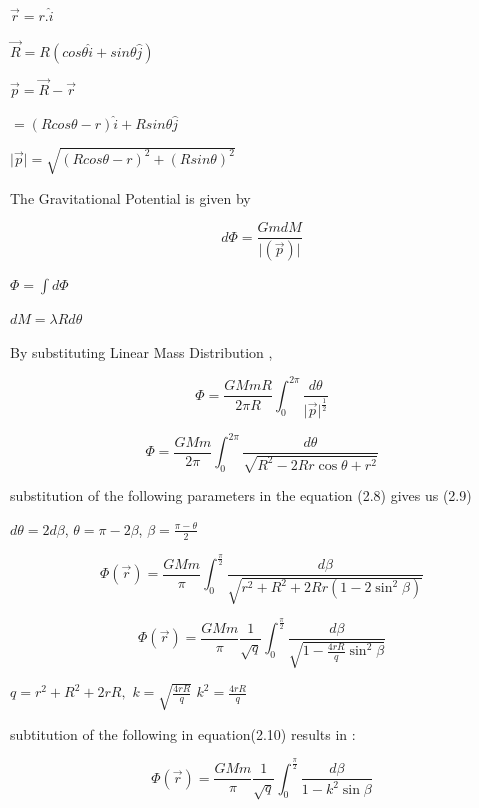 \begin{center}
$ \vec{r} = r.\hat{i} $

$ \vec{R} = R(cos \theta \hat{i} + sin \theta \hat{j} ) $

$ \vec{p} = \vec{R}-\vec{r} $

$ = (R cos \theta-r) \hat{i} + R sin \theta \hat{j} $


$ \vert \vec{p}\vert = \sqrt{(R cos \theta - r)^{2} + (R sin \theta )^{2} }$


 

The Gravitational Potential is given by 

\begin{equation}
 d{\Phi}= \frac{GmdM}{\vert (\vec{p})\vert} 
\end{equation}


$ \Phi = \int {d{\Phi}} $
  

$ d M = \lambda R d \theta  $

By substituting Linear Mass Distribution ,

\begin{equation}
\Phi= \frac{GMmR}{2\pi R} \int_{0}^{2\pi} \frac {d \theta } {\vert \vec{p} \vert^\frac{1}{2}}
\end{equation}

\begin{equation}
\Phi= \frac{GMm}{2\pi} \int_{0}^{2\pi}  
\frac{d{\theta}}{\sqrt{R^2 - 2 R r \cos \theta + r^2}}
\end{equation}


substitution of the following parameters in the equation (2.8) gives us (2.9)

$ d \theta = 2 d \beta $,
$ \theta = \pi - 2 \beta $,
$ \beta = \frac{\pi - \theta}{2} $

\begin{equation}
\Phi (\vec{r}) = \frac{GMm}{ \pi} \int_{0}^{\frac{\pi}{2}}  \frac{d \beta }{\sqrt{r^2 + R^2 +2 R r (1 - 2 \sin^2 \beta )}}  
\end{equation}

\begin{equation}
\Phi (\vec{r}) = \frac{GMm}{ \pi} \frac{1}{\sqrt{q}} \int_{0}^{\frac{ \pi}{2}} \frac{d \beta }{\sqrt{1 - \frac{4 r R}{q} \sin^2 \beta}}   
\end{equation}
 

$ q = r^2 + R^2 +2 r R, $ 
$ k = \sqrt{\frac{4 r R }{q}} $
$ k^2 = \frac{4 r R}{q} $

subtitution of the following in equation(2.10) results in :

\begin{equation}
\Phi (\vec{r}) = \frac{GMm}{ \pi} \frac{1}{\sqrt{q}} \int_{0}^{\frac{ \pi}{2}} \frac{d \beta } {1 - k^2 \sin \beta } 
\end{equation}


\end{center}
